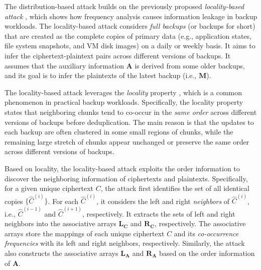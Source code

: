 \documentclass[bachelor]{thesis-uestc}
\begin{document}
The distribution-based attack builds on the previously proposed {\em
locality-based attack} \cite{li17}, which shows how frequency analysis causes
information leakage in backup workloads.  The locality-based attack considers
{\em full backups} (or backups for short) that are created as the complete
copies of primary data (e.g., application states, file system snapshots, and
VM disk images) on a daily or weekly basis. It aims to infer the
ciphertext-plaintext pairs across different versions of backups.  It assumes
that the auxiliary information $\mathbf{A}$ is derived from some older
backups, and its goal is to infer the plaintexts of the latest backup (i.e.,
$\mathbf{M}$). 

The locality-based attack leverages the {\em locality} property
\cite{xia11,zhu08,lillibridge09}, which is a common phenomenon in practical
backup workloads. Specifically, the locality property states that neighboring
chunks tend to co-occur in the {\em same order} across different versions of
backups before deduplication. The main reason is that the updates to each
backup are often clustered in some small regions of chunks, while the
remaining large stretch of chunks appear unchanged or preserve the same order
across different versions of backups.  

Based on locality, the locality-based attack exploits the order information to
discover the neighboring information of ciphertexts and plaintexts.
Specifically, for a given unique ciphertext $C$, the attack first identifies
the set of all identical copies $\{\hat{C}^{(i)}\}$.  For each
$\hat{C}^{(i)}$, it considers the left and right {\em neighbors} of
$\hat{C}^{(i)}$, i.e., $\hat{C}^{(i-1)}$ and $\hat{C}^{(i+1)}$, respectively.
It extracts the sets of left and right neighbors into the associative arrays
$\mathbf{L_C}$ and $\mathbf{R_C}$, respectively.  The associative arrays store
the mappings of each unique ciphertext $C$ and its {\em co-occurrence
frequencies} with its left and right neighbors, respectively.   Similarly, the attack also constructs the
associative arrays $\mathbf{L_A}$ and $\mathbf{R_A}$ based on the order
information of $\mathbf{A}$. 
\end{document}
